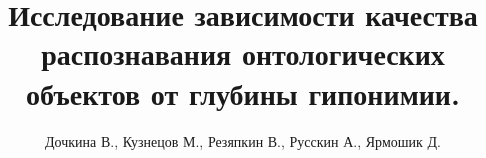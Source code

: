 \documentclass[12pt,twoside]{article}
\title
    [Исследование зависимости качества распознавания онтологических объектов от глубины гипонимии.]
    {Исследование зависимости качества распознавания онтологических объектов от глубины гипонимии.}
\author
    [Резяпкин~В.\,Н.]
    {Дочкина В., Кузнецов М., Резяпкин В., Русскин А., Ярмошик Д.}
\begin{document}
\maketitle
\bigskip
\bigskip
\bigskip
\bigskip

\end{document}
